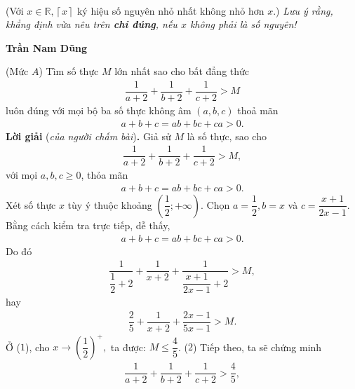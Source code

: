 \begin{multicols}{2}
\begin{align*}
	\end{align*}
	(Với $x \in \mathbb{R}, \left\lceil x \right\rceil $    ký hiệu số nguyên nhỏ nhất không nhỏ hơn $x$.)
	\vskip 0.05cm
	\textit{Lưu ý rằng, khẳng định vừa nêu trên \textbf{\color{thachthuctoanhoc}chỉ đúng}, nếu $x$ không phải là số nguyên!}
	\begin{flushright}
		\textbf{\color{thachthuctoanhoc}Trần Nam Dũng}
	\end{flushright}
	{}
	(Mức $A$) Tìm số thực $M$ lớn nhất sao cho bất đẳng thức 
	\begin{align*}
		\dfrac{1}{{a + 2}} + \dfrac{1}{{b + 2}} + \dfrac{1}{{c + 2}} > M
	\end{align*}
	luôn đúng với mọi bộ ba số thực không âm $(a,b,c)$ thoả mãn  
	\begin{align*}
		a+b+c=ab+bc+ca>0.
	\end{align*}
	\textbf{\color{thachthuctoanhoc}Lời giải} (\textit{của người chấm bài})\textbf{\color{thachthuctoanhoc}.}
	\vskip 0.05cm
	Giả sử $M$ là số thực, sao cho
	\begin{align*}
		\dfrac{1}{{a + 2}} + \dfrac{1}{{b + 2}} + \dfrac{1}{{c + 2}} > M,
	\end{align*}
	với mọi $a, b, c \ge  0$, thỏa mãn 
	\begin{align*}
		a + b + c = ab + bc + ca > 0.
	\end{align*}
	Xét số thực $x$ tùy ý thuộc khoảng $\left( {\dfrac{1}{2}; + \infty } \right).$
	\vskip 0.05cm 
	Chọn  $a = \dfrac{1}{2}, b = x$ và $c = \dfrac{x+1}{2x-1}$.
	\vskip 0.05cm
	Bằng cách kiểm tra trực tiếp, dễ thấy, 
	\begin{align*}
		a + b + c = ab + bc + ca > 0.
	\end{align*}
	Do đó
	\begin{align*}
		\dfrac{1}{{\dfrac{1}{2} + 2}} + \dfrac{1}{{x + 2}} + \dfrac{1}{{\dfrac{{x + 1}}{{2x - 1}} + 2}} > M,
	\end{align*}
	hay                                                                         \begin{align*}
		\dfrac{2}{5} + \dfrac{1}{{x + 2}} + \dfrac{{2x - 1}}{{5x - 1}} > M. \tag{$1$}
	\end{align*}
	Ở ($1$), cho $x \to {\left( {\dfrac{1}{2}} \right)^ + },$ ta được: $M \le \dfrac{4}{5}$. \hfill ($2$)
	\vskip 0.05cm
	Tiếp theo, ta sẽ chứng minh
	\begin{align*}
		\dfrac{1}{{a + 2}} + \dfrac{1}{{b + 2}} + \dfrac{1}{{c + 2}} > \dfrac{4}{5}, \tag{$3$}
	\end{align*}

\end{multicols}
